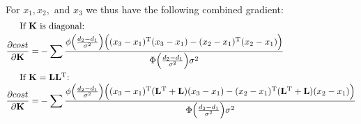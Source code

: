\documentclass[12pt]{article}
\newcommand\K{\mathbf{K}}
\newcommand\T{\text{T}}
\newcommand\EL{\mathbf{L}}
\begin{document}
For $x_1, x_2,$ and $x_3$ we thus have the following combined gradient:
\begin{align*}
\noalign{If $\K$ is diagonal:}
\frac{\partial cost}{\partial \K} =& -\sum \frac{\phi\Big(\frac{d_2-d_1}{\sigma^2}\Big)\Big((x_3-x_1)^\T(x_3-x_1)-(x_2-x_1)^\T(x_2-x_1)\Big)}{\Phi\Big(\frac{d_2-d_1}{\sigma^2}\Big)\sigma^2}\\
\noalign{If $\K = \EL\EL^\T$:}
\frac{\partial cost}{\partial \K} =& -\sum \frac{\phi\Big(\frac{d_2-d_1}{\sigma^2}\Big)\Big((x_3-x_1)^\T(\EL^\T+\EL)(x_3-x_1)-(x_2-x_1)^\T(\EL^\T+\EL)(x_2-x_1)\Big)}{\Phi\Big(\frac{d_2-d_1}{\sigma^2}\Big)\sigma^2}
\end{align*}
\end{document}
